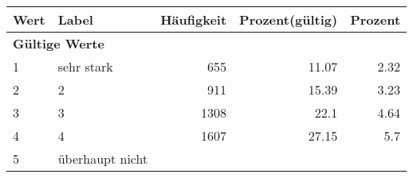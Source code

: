      \begin{longtable}{lXrrr}
     \toprule
     \textbf{Wert} & \textbf{Label} & \textbf{Häufigkeit} & \textbf{Prozent(gültig)} & \textbf{Prozent} \\
     \endhead
     \midrule
     \multicolumn{5}{l}{\textbf{Gültige Werte}}\\

     1 &
     \multicolumn{1}{X}{ sehr stark   } &


       \num{655} &
       \num[round-mode=places,round-precision=2]{11.07} &
         \num[round-mode=places,round-precision=2]{2.32} \\

     2 &
     \multicolumn{1}{X}{ 2   } &


       \num{911} &
       \num[round-mode=places,round-precision=2]{15.39} &
         \num[round-mode=places,round-precision=2]{3.23} \\

     3 &
     \multicolumn{1}{X}{ 3   } &


       \num{1308} &
       \num[round-mode=places,round-precision=2]{22.1} &
         \num[round-mode=places,round-precision=2]{4.64} \\

     4 &
     \multicolumn{1}{X}{ 4   } &


       \num{1607} &
       \num[round-mode=places,round-precision=2]{27.15} &
         \num[round-mode=places,round-precision=2]{5.7} \\

     5 &
     \multicolumn{1}{X}{ überhaupt nicht   } &



\end{longtable}
